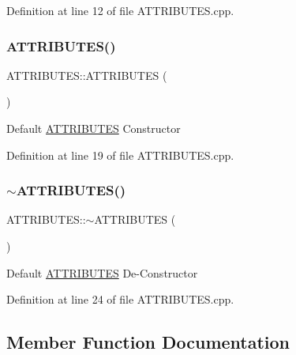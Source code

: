 Definition at line 12 of file A\+T\+T\+R\+I\+B\+U\+T\+E\+S.\+cpp.

\mbox{\label{class_a_t_t_r_i_b_u_t_e_s_a66b162d2497d7e9b6bb95b2f83d539db}} 
\subsubsection{\texorpdfstring{ATTRIBUTES()}{ATTRIBUTES()}\hspace{0.1cm}{\footnotesize\ttfamily [2/2]}}
{\footnotesize\ttfamily A\+T\+T\+R\+I\+B\+U\+T\+E\+S\+::\+A\+T\+T\+R\+I\+B\+U\+T\+ES (\begin{DoxyParamCaption}{ }\end{DoxyParamCaption})}



Default \mbox{\hyperlink{class_a_t_t_r_i_b_u_t_e_s}{A\+T\+T\+R\+I\+B\+U\+T\+ES}} Constructor 



Definition at line 19 of file A\+T\+T\+R\+I\+B\+U\+T\+E\+S.\+cpp.

\mbox{\label{class_a_t_t_r_i_b_u_t_e_s_ae2a7c145617a80e7367e2ed7c6fbd50a}} 
\subsubsection{\texorpdfstring{$\sim$ATTRIBUTES()}{~ATTRIBUTES()}}
{\footnotesize\ttfamily A\+T\+T\+R\+I\+B\+U\+T\+E\+S\+::$\sim$\+A\+T\+T\+R\+I\+B\+U\+T\+ES (\begin{DoxyParamCaption}{ }\end{DoxyParamCaption})}



Default \mbox{\hyperlink{class_a_t_t_r_i_b_u_t_e_s}{A\+T\+T\+R\+I\+B\+U\+T\+ES}} De-\/\+Constructor 



Definition at line 24 of file A\+T\+T\+R\+I\+B\+U\+T\+E\+S.\+cpp.



\subsection{Member Function Documentation}
\mbox{\label{class_a_t_t_r_i_b_u_t_e_s_ac1653b73b37c39c05aa08abb4885d579}} 
